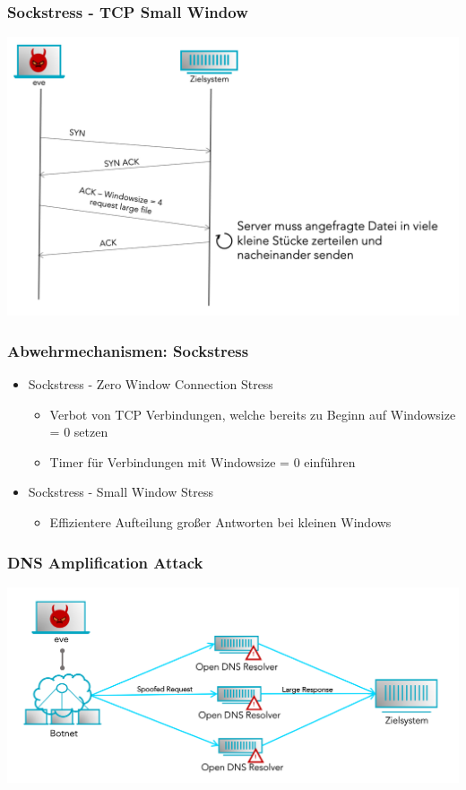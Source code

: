 \documentclass{beamer}
\begin{document}
\begin{frame}
	\frametitle{Sockstress - TCP Small Window}
	\begin{center}
		\includegraphics[width=1.0\linewidth]{img/smallwin}
	\end{center}
\end{frame}

\begin{frame}
	\frametitle{Abwehrmechanismen: Sockstress}
	\begin{itemize}
		\item Sockstress - Zero Window Connection Stress
		      \begin{itemize}
			      \item Verbot von TCP Verbindungen, welche bereits zu Beginn auf Windowsize = 0 setzen
			      \item Timer für Verbindungen mit Windowsize = 0 einführen
		      \end{itemize}
		\item Sockstress - Small Window Stress
		      \begin{itemize}
			      \item Effizientere Aufteilung großer Antworten bei kleinen Windows
		      \end{itemize}
	\end{itemize}
\end{frame}

\begin{frame}
	\frametitle{DNS Amplification Attack}
	\begin{center}
		\includegraphics[width=1.0\linewidth]{img/DNSAmplificationAttack}
	\end{center}
\end{frame}
\end{document}
